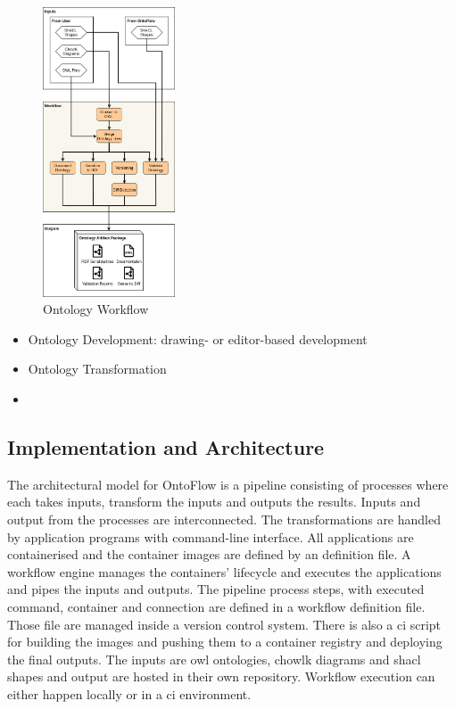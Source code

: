 \documentclass[sigconf]{acmart}
\begin{document}
\begin{figure}[ht]
  \centering
  \includegraphics[width=0.35\textwidth]{workflow.png}
  \caption{Ontology Workflow}
  \label{fig2}
\end{figure}
\begin{itemize}
  \item Ontology Development: drawing- or editor-based development 
  \item Ontology Transformation
  \item 
\end{itemize}

\subsection{Implementation and Architecture}

The architectural model for OntoFlow is a pipeline consisting of processes where each takes inputs, transform the inputs and outputs the results.
Inputs and output from the processes are interconnected.
The transformations are handled by application programs with command-line interface.
All applications are containerised and the container images are defined by an definition file.
A workflow engine manages the containers' lifecycle and executes the applications and pipes the inputs and outputs.
The pipeline process steps, with executed command\todo{}, container and connection are defined in a workflow definition file.
Those file are managed inside a version control system. There is also a ci script for building the images and pushing them to a container registry and deploying the final outputs.
The inputs are owl ontologies, chowlk diagrams and shacl shapes and output are hosted in their own repository.
Workflow execution can either happen locally or in a ci environment.
\end{document}
